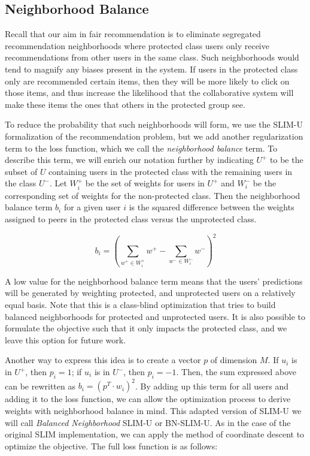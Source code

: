 \subsection{Neighborhood Balance}

Recall that our aim in fair recommendation is to eliminate segregated recommendation neighborhoods where protected class users only receive recommendations from other users in the same class. Such neighborhoods would tend to magnify any biases present in the system. If users in the protected class only are recommended certain items, then they will be more likely to click on those items, and thus increase the likelihood that the collaborative system will make these items the ones that others in the protected group see.

To reduce the probability that such neighborhoods will form, we use the SLIM-U formalization of the recommendation problem, but we add another regularization term to the loss function, which we call the \textit{neighborhood balance} term. To describe this term, we will enrich our notation further by indicating $U^+$ to be the subset of $U$ containing users in the protected class with the remaining users in the class $U^-$. Let $W_i^+$ be the set of weights for users in $U^+$ and $W_i^-$ be the corresponding set of weights for the non-protected class. Then the neighborhood balance term $b_i$ for a given user $i$ is the squared difference between the weights assigned to peers in the protected class versus the unprotected class.

\begin{equation}
    b_i = (\sum_{w^+ \in W_i^+}{w^+} - \sum_{w^- \in W_i^-}{w^-})^2
\end{equation}
\vspace{0.25cm}

A low value for the neighborhood balance term means that the users' predictions will be generated by weighting protected, and unprotected users on a relatively equal basis. Note that this is a class-blind optimization that tries to build balanced neighborhoods for protected and unprotected users. It is also possible to formulate the objective such that it only impacts the protected class, and we leave this option for future work.

Another way to express this idea is to create a vector $p$ of dimension $M$. If $u_i$ is in $U^+$, then $p_i = 1$; if $u_i$ is in $U^-$, then $p_i = -1$. Then, the sum expressed above can be rewritten as $b_i = (p^T \cdot w_i)^2$. By adding up this term for all users and adding it to the loss function, we can allow the optimization process to derive weights with neighborhood balance in mind. This adapted version of SLIM-U we will call \textit{Balanced Neighborhood} SLIM-U or BN-SLIM-U. As in the case of the original SLIM implementation, we can apply the method of coordinate descent to optimize the objective. The full loss function is as follows:

